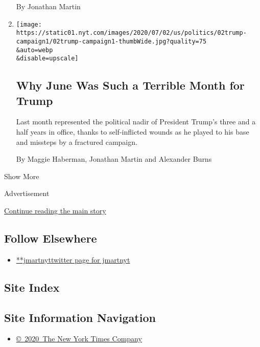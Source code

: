 \begin{enumerate}
  By Jonathan Martin
\item
  \href{/2020/07/02/us/politics/trump-2020-campaign-problems.html}{}

  \texttt{[image: https://static01.nyt.com/images/2020/07/02/us/politics/02trump-campaign1/02trump-campaign1-thumbWide.jpg?quality=75\\\&auto=webp\\\&disable=upscale]}

  \hypertarget{why-june-was-such-a-terrible-month-for-trump}{%
  \subsection{Why June Was Such a Terrible Month for
  Trump}\label{why-june-was-such-a-terrible-month-for-trump}}

  Last month represented the political nadir of President Trump's three
  and a half years in office, thanks to self-inflicted wounds as he
  played to his base and missteps by a fractured campaign.

  By Maggie Haberman, Jonathan Martin and Alexander Burns
\end{enumerate}

Show More

Advertisement

\protect\hyperlink{after-mid2}{Continue reading the main story}

\hypertarget{follow-elsewhere}{%
\subsection{Follow Elsewhere}\label{follow-elsewhere}}

\begin{itemize}
\tightlist
\item
  \href{https://twitter.com/jmartnyt}{**jmartnyttwitter page for
  jmartnyt}
\end{itemize}

\hypertarget{site-index}{%
\subsection{Site Index}\label{site-index}}

\hypertarget{site-information-navigation}{%
\subsection{Site Information
Navigation}\label{site-information-navigation}}

\begin{itemize}
\tightlist
\item
  \href{https://help.nytimes.com/hc/en-us/articles/115014792127-Copyright-notice}{©~2020~The
  New York Times Company}
\end{itemize}

